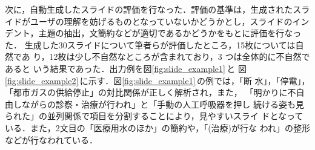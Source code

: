 次に，自動生成したスライドの評価を行なった．評価の基準は，生成されたスラ
イドがユーザの理解を妨げるものとなっていないかどうかとし，スライドのイン
デント，主題の抽出，文簡約などが適切であるかどうかをもとに評価を行なった．
生成した30スライドについて筆者らが評価したところ，15枚については自然であ
り，12枚は少し不自然なところが含まれており，3 つは全体的に不自然であると
いう結果であった．出力例を図\ref{fig:slide_example1}\,と
図\ref{fig:slide_example2}\,に示す．図\ref{fig:slide_example1}\,の例では，「断
水」，「停電」，「都市ガスの供給停止」の対比関係が正しく解析され，また，
「明かりに不自由しながらの診察・治療が行われ」と「手動の人工呼吸器を押し
続ける姿も見られた」の並列関係で項目を分割することにより，見やすいスライ
ドとなっている．また，2文目の「医療用水のほか」の簡約や，「(治療)が行な
われ」の整形などが行なわれている．

